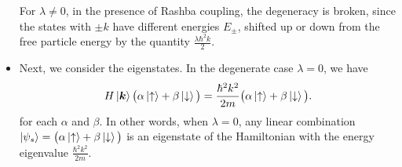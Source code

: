 \documentclass[11pt, a4paper]{article}
\renewcommand{\vec}[1]{\bm{#1}} %
\newcommand{\ua}{\uparrow}  %
\newcommand{\da}{\downarrow}  %
\renewcommand{\k}{\vec{k}}  %
\begin{document}
\begin{itemize}
	For $ \lambda \neq 0 $, in the presence of Rashba coupling, the degeneracy is broken, since the states with $ \pm k $ have different energies $ E_{\pm} $, shifted up or down from the free particle energy by the quantity $ \frac{\lambda \hbar^{2}k}{2} $.
	
	\item Next, we consider the eigenstates. In the degenerate case $ \lambda = 0 $, we have
	\begin{equation*}
		H \ket{\k} \big(\alpha \ket{\ua} + \beta \ket{\da}\big) = \frac{\hbar^{2}k^{2}}{2m}\big(\alpha \ket{\ua} + \beta \ket{\da}\big).
	\end{equation*}
	for each $ \alpha $ and $ \beta $. In other words, when $ \lambda = 0 $, any linear combination $ \ket{\psi_{s}} = \big(\alpha \ket{\ua} + \beta \ket{\da}\big) $ is an eigenstate of the Hamiltonian with the energy eigenvalue $  \frac{\hbar^{2}k^{2}}{2m} $.
	

\end{itemize}
\end{document}
